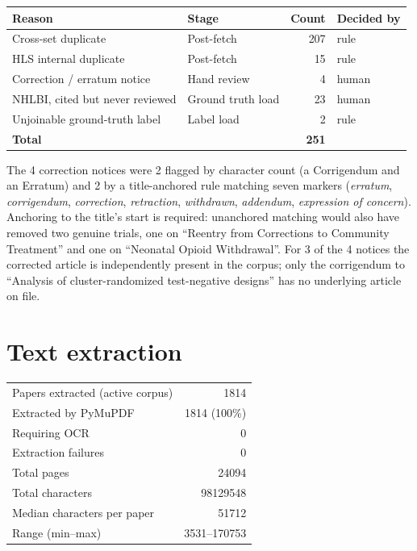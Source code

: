\documentclass[11pt]{article}
\begin{document}
\begin{table}[h]
\centering
\begin{tabular}{llrl}
\toprule
\textbf{Reason} & \textbf{Stage} & \textbf{Count} & \textbf{Decided by} \\
\midrule
Cross-set duplicate & Post-fetch & 207 & rule \\
HLS internal duplicate & Post-fetch & 15 & rule \\
Correction / erratum notice & Hand review & 4 & human \\
NHLBI, cited but never reviewed & Ground truth load & 23 & human \\
Unjoinable ground-truth label & Label load & 2 & rule \\
\midrule
\textbf{Total} & & \textbf{251} & \\
\bottomrule
\end{tabular}
\end{table}

The 4 correction notices were 2 flagged by character count (a Corrigendum and an Erratum) and 2 by a
title-anchored rule matching seven markers (\emph{erratum}, \emph{corrigendum}, \emph{correction},
\emph{retraction}, \emph{withdrawn}, \emph{addendum}, \emph{expression of concern}). Anchoring to the
title's start is required: unanchored matching would also have removed two genuine trials, one on
``Reentry from Corrections to Community Treatment'' and one on ``Neonatal Opioid Withdrawal''. For 3 of
the 4 notices the corrected article is independently present in the corpus; only the corrigendum to
``Analysis of cluster-randomized test-negative designs'' has no underlying article on file.

\section{Text extraction}

\begin{table}[h]
\centering
\begin{tabular}{lr}
\toprule
Papers extracted (active corpus) & 1814 \\
Extracted by PyMuPDF & 1814 (100\%) \\
Requiring OCR & 0 \\
Extraction failures & 0 \\
Total pages & \num{24094} \\
Total characters & \num{98129548} \\
Median characters per paper & \num{51712} \\
Range (min--max) & \num{3531}--\num{170753} \\
\bottomrule
\end{tabular}
\end{table}
\end{document}
